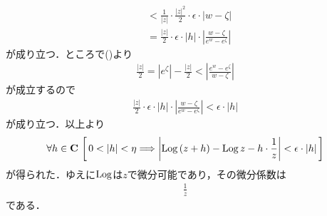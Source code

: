 \begin{sketch}
\begin{description}
\begin{align}
					&< \frac{1}{|z|} \cdot \frac{|z|^2}{2} \cdot \epsilon \cdot |w - \zeta| \\
					&= \frac{|z|}{2} \cdot \epsilon \cdot |h| \cdot \left|\frac{w-\zeta}{e^{w} - e^{\zeta}}\right|
				\end{align}
				が成り立つ．ところで()より
				\begin{align}
					\frac{|z|}{2} = |e^{\zeta}| - \frac{|z|}{2} 
					< \left|\frac{e^{w} - e^{\zeta}}{w- \zeta}\right|
				\end{align}
				が成立するので
				\begin{align}
					\frac{|z|}{2} \cdot \epsilon \cdot |h| \cdot \left|\frac{w-\zeta}{e^{w} - e^{\zeta}}\right|
					< \epsilon \cdot |h|
				\end{align}
				が成り立つ．以上より
				\begin{align}
					\forall h \in \mathbf{C}\,
					\left[\, 0 < |h| < \eta \Longrightarrow \left|\operatorname{Log}{(z+h)} - \operatorname{Log}{z} - h \cdot \frac{1}{z}\right| < \epsilon \cdot |h|\, \right]
				\end{align}
				が得られた．ゆえに$\operatorname{Log}$は$z$で微分可能であり，その微分係数は
				\begin{align}
					\frac{1}{z}
				\end{align}
				である．
				\QED
		\end{description}
	\end{sketch}